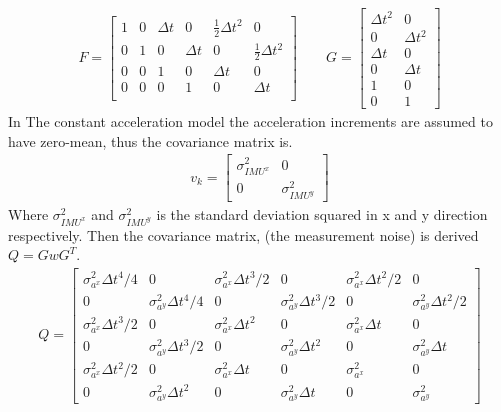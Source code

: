 \begin{align}
F=
\begin{bmatrix}
1 & 0 & \Delta t & 0 & \frac{1}{2}\Delta t^2 & 0 \\ 
0 & 1 & 0 &\Delta t & 0 & \frac{1}{2}\Delta t^2 \\ 
0 & 0 & 1 & 0 & \Delta t & 0 \\ 
0 & 0 & 0 & 1 & 0 & \Delta t \\ 
\end{bmatrix}
\qquad G=
\begin{bmatrix}
\Delta t^2 & 0\\
0 & \Delta t^2\\
\Delta t & 0\\
0 & \Delta t\\
1 & 0\\
0 & 1
\end{bmatrix}
\label{eq.F,G}
\end{align}
In The constant acceleration model the acceleration increments are assumed to have zero-mean, thus the covariance matrix is.
\begin{align}
v_k=
\begin{bmatrix}
\sigma^2_{{}IMU^x} & 0\\
0 & \sigma^2_{{IMU}^y}
\end{bmatrix}
\end{align}
Where $\sigma^2_{{IMU}^x}$ and $\sigma^2_{{IMU}^y}$ is the standard deviation squared in x and y direction respectively.
Then the covariance matrix, (the measurement noise) is derived $Q=GwG^T$.
\begin{align}
Q=
\begin{bmatrix}
\sigma^2_{a^x}\Delta t^4/4 & 0 & \sigma^2_{a^x}\Delta t^3/2 & 0 & \sigma^2_{a^x}\Delta t^2/2 & 0\\
0 & \sigma^2_{a^y}\Delta t^4/4 & 0 & \sigma^2_{a^y}\Delta t^3/2 & 0 & \sigma^2_{a^y}\Delta t^2/2\\
\sigma^2_{a^x}\Delta t^3/2 & 0 & \sigma^2_{a^x}\Delta t^2 & 0 & \sigma^2_{a^x}\Delta t & 0\\
0 & \sigma^2_{a^y}\Delta t^3/2 & 0 & \sigma^2_{a^y}\Delta t^2 & 0 & \sigma^2_{a^y}\Delta t\\
\sigma^2_{a^x}\Delta t^2/2 & 0 & \sigma^2_{a^x}\Delta t & 0 & \sigma^2_{a^x} & 0\\
0 & \sigma^2_{a^y}\Delta t^2 & 0 & \sigma^2_{a^y}\Delta t & 0 & \sigma^2_{a^y}
\end{bmatrix}
\label{eq.Q}
\end{align}

